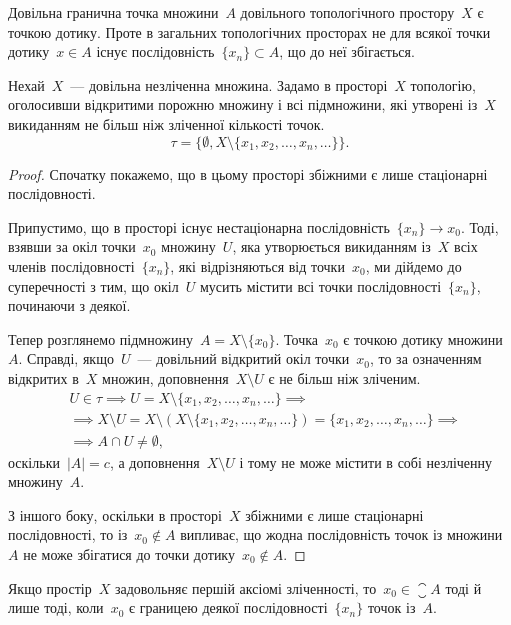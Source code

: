 Довільна гранична точка множини~$A$ довільного топологічного простору~$X$ є точкою дотику. Проте в загальних топологічних просторах не для всякої точки дотику~$x \in A$ існує послідовність~$\{x_n\} \subset A$, що до неї збігається.

\begin{example}
    Нехай~$X$~--- довільна незліченна множина. Задамо в просторі~$X$ топологію, оголосивши відкритими порожню множину і всі підмножини, які утворені із~$X$ викиданням не більш ніж зліченної кількості точок.
    \[ \tau = \{ \emptyset, X \setminus \{ x_1, x_2, \ldots, x_n, \ldots\} \}. \]
\end{example}

\begin{proof}
    Спочатку покажемо, що в цьому просторі збіжними є лише стаціонарні послідовності.

    Припустимо, що в просторі існує нестаціонарна послідовність~$\{x_n\} \to x_0$. Тоді, взявши за окіл точки~$x_0$ множину~$U$, яка утворюється викиданням із~$X$ всіх членів послідовності~$\{x_n\}$, які відрізняються від точки~$x_0$, ми дійдемо до суперечності з тим, що окіл~$U$ мусить містити всі точки послідовності~$\{x_n\}$, починаючи з деякої.

    Тепер розглянемо підмножину~$A = X \setminus \{x_0\}$. Точка~$x_0$ є точкою дотику множини~$A$. Справді, якщо~$U$~--- довільний відкритий окіл точки~$x_0$, то за означенням відкритих в~$X$ множин, доповнення~$X \setminus U$ є не більш ніж зліченим.
    \begin{align*}
        & U \in \tau \implies U = X \setminus \{ x_1, x_2, \ldots, x_n, \ldots \} \implies \\
        & \implies X \setminus U = X \setminus (X \setminus \{ x_1, x_2, \ldots, x_n, \ldots \}) = \{ x_1, x_2, \ldots, x_n, \ldots \} \implies \\
        & \implies A \cap U \ne \emptyset,
    \end{align*}
    оскільки~$|A| = c$, а доповнення~$X \setminus U$ і тому не може містити в собі незліченну множину~$A$.

    З іншого боку, оскільки в просторі~$X$ збіжними є лише стаціонарні послідовності, то із~$x_0 \notin A$ випливає, що жодна послідовність точок із множини~$A$ не може збігатися до точки дотику~$x_0 \notin A$.
\end{proof}

\begin{theorem}
    Якщо простір~$X$ задовольняє першій аксіомі зліченності, то~$x_0 \in \closure{A}$ тоді й лише тоді, коли~$x_0$ є границею деякої послідовності~$\{x_n\}$ точок із~$A$.
\end{theorem}

